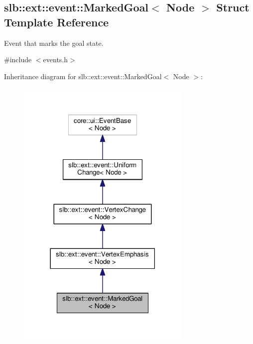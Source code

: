 \hypertarget{structslb_1_1ext_1_1event_1_1MarkedGoal}{}\subsection{slb\+:\+:ext\+:\+:event\+:\+:Marked\+Goal$<$ Node $>$ Struct Template Reference}
\label{structslb_1_1ext_1_1event_1_1MarkedGoal}


Event that marks the goal state.  




{\ttfamily \#include $<$events.\+h$>$}



Inheritance diagram for slb\+:\+:ext\+:\+:event\+:\+:Marked\+Goal$<$ Node $>$\+:\nopagebreak
\begin{figure}[H]
\begin{center}
\leavevmode
\includegraphics[width=237pt]{structslb_1_1ext_1_1event_1_1MarkedGoal__inherit__graph}
\end{center}
\end{figure}


